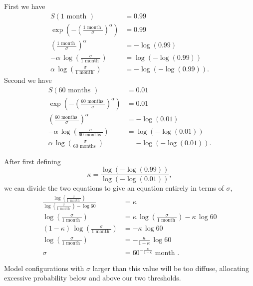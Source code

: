 \documentclass[
  letterpaper,
  DIV=11,
  numbers=noendperiod]{scrartcl}
\begin{document}
First we have \begin{align*}
S( 1 \text{ month }) &= 0.99
\\
\exp \left(
  -\left( \frac{ 1 \text{ month } }{ \sigma } \right)^\alpha
\right)
&=
0.99
\\
\left( \frac{ 1 \text{ month } }{ \sigma } \right)^\alpha
&=
-\log(0.99)
\\
-\alpha \, \log \left( \frac{ \sigma }{ 1 \text{ month } } \right)
&=
\log(-\log(0.99))
\\
\alpha \, \log \left( \frac{ \sigma }{ 1 \text{ month } } \right)
&=
-\log(-\log(0.99)).
\end{align*} Second we have \begin{align*}
S( 60 \text{ months }) &= 0.01
\\
\exp \left(
  -\left( \frac{ 60 \text{ months } }{ \sigma } \right)^\alpha
\right)
&=
0.01
\\
\left( \frac{ 60 \text{ months } }{ \sigma } \right)^\alpha
&=
-\log(0.01)
\\
-\alpha \, \log \left( \frac{ \sigma }{ 60 \text{ months } } \right)
&=
\log(-\log(0.01))
\\
\alpha \, \log \left( \frac{ \sigma }{ 60 \text{ months } } \right)
&=
-\log(-\log(0.01)).
\end{align*}

After first defining \[
\kappa = \frac{ \log(-\log(0.99)) }{ \log(-\log(0.01)) },
\] we can divide the two equations to give an equation entirely in terms
of \(\sigma\), \begin{align*}
\frac{
  \log \left( \frac{ \sigma }{ 1 \text{ month } } \right)
}{
  \log \left( \frac{ \sigma }{ 1 \text{ month } } \right)
  - \log 60
}
&=
\kappa
\\
\log \left( \frac{ \sigma }{ 1 \text{ month } } \right)
&=
  \kappa \, \log \left( \frac{ \sigma }{ 1 \text{ month } } \right)
- \kappa \, \log 60
\\
( 1 - \kappa ) \,
\log \left( \frac{ \sigma }{ 1 \text{ month } } \right)
&=
- \kappa \, \log 60
\\
\log \left( \frac{ \sigma }{ 1 \text{ month } } \right)
&=
- \frac{ \kappa }{ 1 - \kappa} \, \log 60
\\
\sigma
&=
60^{- \frac{ \kappa }{ 1 - \kappa} } \text{ month }.
\end{align*}

Model configurations with \(\sigma\) larger than this value will be too
diffuse, allocating excessive probability below and above our two
thresholds.
\end{document}
